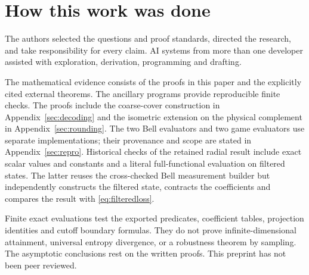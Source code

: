 \section*{How this work was done}\label{sec:methods}

The authors selected the questions and proof standards, directed the research, and take responsibility for every claim. AI systems from more than one developer assisted with exploration, derivation, programming and drafting.

The mathematical evidence consists of the proofs in this paper and the explicitly cited external theorems. The ancillary programs provide reproducible finite checks. The proofs include the coarse-cover construction in Appendix~\ref{sec:decoding} and the isometric extension on the physical complement in Appendix~\ref{sec:rounding}. The two Bell evaluators and two game evaluators use separate implementations; their provenance and scope are stated in Appendix~\ref{sec:repro}. Historical checks of the retained radial result include exact scalar values and constants and a literal full-functional evaluation on filtered states. The latter reuses the cross-checked Bell measurement builder but independently constructs the filtered state, contracts the coefficients and compares the result with \eqref{eq:filteredloss}.

Finite exact evaluations test the exported predicates, coefficient tables, projection identities and cutoff boundary formulas. They do not prove infinite-dimensional attainment, universal entropy divergence, or a robustness theorem by sampling. The asymptotic conclusions rest on the written proofs. This preprint has not been peer reviewed.
